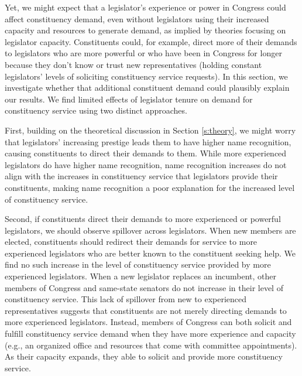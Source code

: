 \documentclass[12pt]{article}
\begin{document}
Yet, we might expect that a legislator's experience or power in Congress could affect constituency demand, even without legislators using their increased capacity and resources to generate demand, as implied by theories focusing on legislator capacity. Constituents could, for example, direct more of their demands to legislators who are more powerful or who have been in Congress for longer because they don't know or trust new representatives (holding constant legislators' levels of soliciting constituency service requests). In this section, we investigate whether that additional constituent demand could plausibly explain our results. We find limited effects of legislator tenure on demand for constituency service using two distinct approaches. 

First, building on the theoretical discussion in Section \ref{s:theory}, we might worry that legislators' increasing prestige leads them to have higher name recognition, causing constituents to direct their demands to them. %
While more experienced legislators do have higher name recognition, name recognition increases do not align with the increases in constituency service that legislators provide their constituents, making name recognition a poor explanation for the increased level of constituency service.  

Second, if constituents direct their demands to more experienced or powerful legislators, we should observe spillover across legislators. When new members are elected, constituents should redirect their demands for service to more experienced legislators who are better known to the constituent seeking help. We find no such increase in the level of constituency service provided by more experienced legislators. When a new legislator replaces an incumbent, other members of Congress and same-state senators do not increase in their level of constituency service. This lack of spillover from new to experienced representatives suggests that constituents are not merely directing demands to more experienced legislators. Instead, members of Congress can both solicit and fulfill constituency service demand when they have more experience and capacity (e.g., an organized office and resources that come with committee appointments). As their capacity expands, they able to solicit and provide more constituency service.  %
\end{document}
